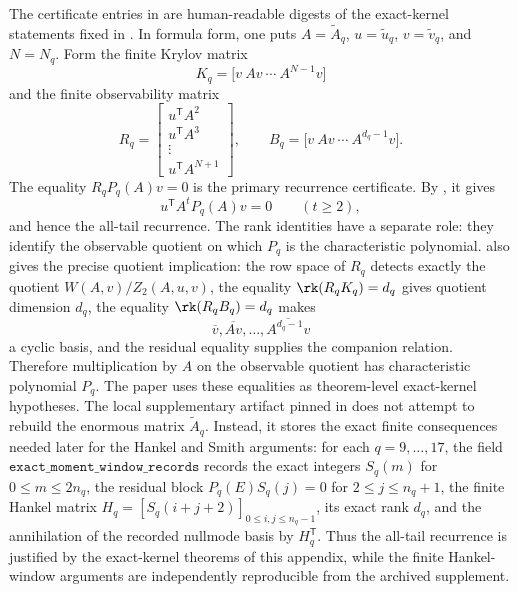 The certificate entries in
 are human-readable digests of
the exact-kernel statements fixed in
.  In formula form, one puts
\(A=\widetilde A_q\), \(u=\widetilde u_q\),
\(v=\widetilde v_q\), and \(N=N_q\).  Form the finite Krylov matrix
\[
  K_q=\bigl[v\ Av\ \cdots\ A^{N-1}v\bigr]
\]
and the finite observability matrix
\[
  R_q=
  \begin{bmatrix}
  u^{\mathsf T}A^2\\
  u^{\mathsf T}A^3\\
  \vdots\\
  u^{\mathsf T}A^{N+1}
  \end{bmatrix},
  \qquad
  B_q=\bigl[v\ Av\ \cdots\ A^{d_q-1}v\bigr].
\]
The equality \(R_qP_q(A)v=0\) is the primary recurrence certificate.  By
, it gives
\[
  u^{\mathsf T}A^tP_q(A)v=0\qquad(t\ge2),
\]
and hence the all-tail recurrence.  The rank identities have a separate role:
they identify the observable quotient on which \(P_q\) is the characteristic
polynomial.
 also gives the precise quotient
implication: the row space of \(R_q\) detects exactly the quotient
\(W(A,v)/Z_2(A,u,v)\), the equality \(\rk(R_qK_q)=d_q\) gives quotient
dimension \(d_q\), the equality \(\rk(R_qB_q)=d_q\) makes
\[
  \overline v,\overline{Av},\dots,\overline{A^{d_q-1}v}
\]
a cyclic basis, and the residual equality supplies the companion relation.
Therefore multiplication by \(A\) on the observable quotient has characteristic
polynomial \(P_q\).
The paper uses these equalities as theorem-level exact-kernel hypotheses.  The
local supplementary artifact pinned in
 does not attempt to rebuild the
enormous matrix \(\widetilde A_q\).  Instead, it stores the exact finite
consequences needed later for the Hankel and Smith arguments: for each
\(q=9,\dots,17\), the field
\(\texttt{exact\_moment\_window\_records}\) records the exact integers
\(S_q(m)\) for \(0\le m\le 2n_q\), the residual block
\(P_q(E)S_q(j)=0\) for \(2\le j\le n_q+1\), the finite Hankel matrix
\(H_q=[S_q(i+j+2)]_{0\le i,j\le n_q-1}\), its exact rank \(d_q\), and the
annihilation of the recorded nullmode basis by \(H_q^{\mathsf T}\).  Thus the
all-tail recurrence is justified by the exact-kernel theorems of this appendix,
while the finite Hankel-window arguments are independently reproducible from the
archived supplement.

